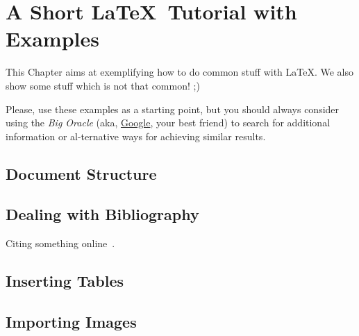 
%

\makeatletter
\newcommand{\ntifpkgloaded}{%
  \@ifpackageloaded%
}
\makeatother


\chapter{A Short \LaTeX\ Tutorial with Examples}
\label{cha:a_short_latex_tutorial_with_examples}

This Chapter aims at exemplifying how to do common stuff with \LaTeX. We also show some stuff which is not that common! ;)

Please, use these examples as a starting point, but you should always consider using the \emph{Big Oracle} (aka, \href{http://www.google.com}{Google}, your best friend) to search for additional information or al-ternative ways for achieving similar results.

\section{Document Structure} %
\label{sec:document_structure}



\section{Dealing with Bibliography} %
\label{sec:dealing_with_bibliography}

Citing something online~\cite{wiki:shuntingyard,flex,bison}.



\section{Inserting Tables} %
\label{sec:inserting_tables}



\section{Importing Images} %
\label{sec:importing_images}

